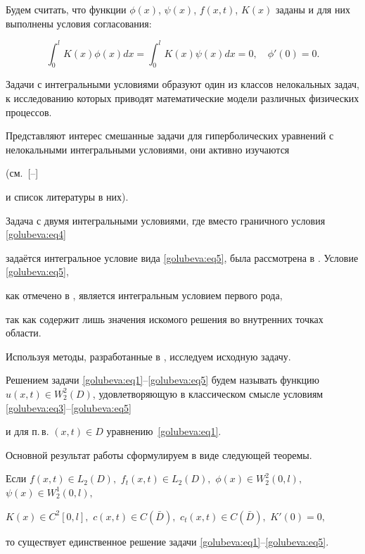 Будем считать, что функции $\phi (x)$, $\psi (x)$, $f(x, t)$, $K(x)$ заданы и для них выполнены условия согласования:

$$

\int _{0}^{l}K(x)\phi (x)dx=\int _{0}^{l}K(x)\psi (x)dx=0, \quad \phi'(0)=0.

$$



Задачи с интегральными условиями образуют один из классов нелокальных задач, к исследованию которых приводят математические модели различных физических процессов.

Представляют интерес смешанные задачи для гиперболических уравнений с нелокальными интегральными условиями, они активно изучаются

(см.~[--]

и список литературы в них).

Задача с двумя интегральными условиями, где вместо граничного условия \eqref{golubeva:eq4}

 задаётся интегральное условие вида \eqref{golubeva:eq5}, была рассмотрена в \cite{golubeva:bib1}. Условие \eqref{golubeva:eq5},

как отмечено в \cite{golubeva:bib3}, является интегральным условием первого рода,

так как содержит лишь значения искомого решения во внутренних точках области.



Используя  методы, разработанные в \cite{golubeva:bib1}, исследуем исходную задачу.



Решением задачи \eqref{golubeva:eq1}--\eqref{golubeva:eq5} будем называть функцию $u(x, t)\in W_{2}^{2}(D)$, удовлетворяющую в классическом смысле условиям \eqref{golubeva:eq3}--\eqref{golubeva:eq5}

и для п.\,в. $(x, t)\in D$ уравнению~\eqref{golubeva:eq1}.



Основной результат работы сформулируем в виде следующей теоремы.



\begin{theorem}

 Если $f(x, t)\in L_{2}(D),$ $f_{t}(x, t)\in L_{2}(D),$ $\phi (x)\in W_{2}^{2}(0, l),$ $\psi (x)\in W_{2}^{1}(0, l),$

 $K(x)\in C^{2}[0, l],$ $c(x, t)\in C(\bar {D}),$ $c_{t}(x, t)\in C(\bar {D}),$ $K'(0)=0,$

 то существует единственное решение задачи \rm \eqref{golubeva:eq1}--\eqref{golubeva:eq5}.

\end{theorem}




